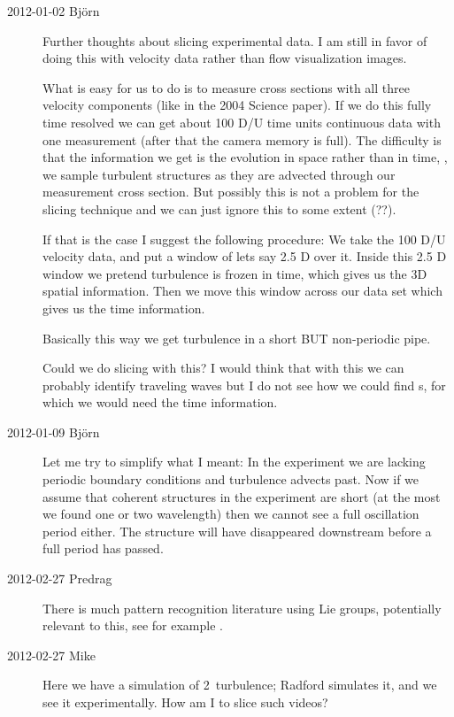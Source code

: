 \begin{description}
\item[2012-01-02 Bj\"orn]
Further thoughts about slicing experimental data. I am still in favor of
doing this with velocity data rather than flow visualization images.

What is easy for us to do is to measure cross sections with all three
velocity components (like in the 2004 Science paper). If we do this fully
time resolved we can get about 100 D/U time units continuous data with
one measurement (after that the camera memory is full). The
difficulty is that the information we get is the evolution in space
rather than in time, \ie, we sample turbulent structures as they
are advected through our measurement cross section. But possibly this is
not a problem for the slicing technique and we can just ignore this to
some extent (??).

If that is the case I suggest the following procedure: We take the 100 D/U
velocity data, and put a window of lets say 2.5 D over it. Inside this
2.5 D window we pretend turbulence is frozen in time, which gives us the
3D spatial information. Then we move this window across our data set
which gives us the time information.

Basically this way we get turbulence in a short BUT non-periodic pipe.

Could we do slicing with this? I would think that with this we can
probably identify traveling waves but I do not see how we could find
\rpo s, for which we would need the time information.

\item[2012-01-09 Bj\"orn]
Let me try to simplify what I meant: In the experiment we are lacking
periodic boundary conditions and turbulence advects past. Now if we
assume that coherent structures in the experiment are short (at  the
most we found one or two wavelength) then we cannot see a full
oscillation period either. The structure will have disappeared downstream
before a full period has passed.

\item[2012-02-27 Predrag] There is much pattern recognition literature
using Lie groups, potentially relevant to this, see for example
.

\item[2012-02-27 Mike] Here we have a simulation of 2\dmn\ turbulence;
Radford simulates it, and we see it experimentally. How am I to slice
such videos?


\end{description}
